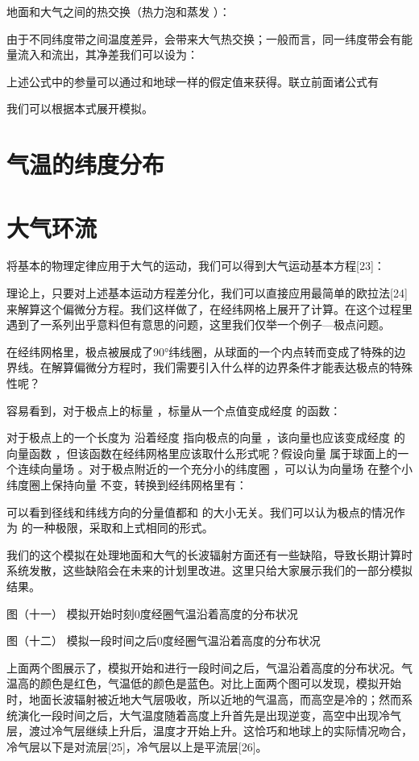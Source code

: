 \documentclass[a4paper,10.5pt]{book}
\begin{document}
地面和大气之间的热交换（热力泡和蒸发 ）：

由于不同纬度带之间温度差异，会带来大气热交换；一般而言，同一纬度带会有能量流入和流出，其净差我们可以设为：

上述公式中的参量可以通过和地球一样的假定值来获得。联立前面诸公式有

我们可以根据本式展开模拟。


\section{气温的纬度分布}

\section{大气环流}

将基本的物理定律应用于大气的运动，我们可以得到大气运动基本方程[23]：



理论上，只要对上述基本运动方程差分化，我们可以直接应用最简单的欧拉法[24]来解算这个偏微分方程。我们这样做了，在经纬网格上展开了计算。在这个过程里遇到了一系列出乎意料但有意思的问题，这里我们仅举一个例子—极点问题。

在经纬网格里，极点被展成了90°纬线圈，从球面的一个内点转而变成了特殊的边界线。在解算偏微分方程时，我们需要引入什么样的边界条件才能表达极点的特殊性呢？

容易看到，对于极点上的标量  ，标量从一个点值变成经度  的函数：



对于极点上的一个长度为  沿着经度  指向极点的向量  ，该向量也应该变成经度  的向量函数  ，但该函数在经纬网格里应该取什么形式呢？假设向量  属于球面上的一个连续向量场  。对于极点附近的一个充分小的纬度圈 ，可以认为向量场  在整个小纬度圈上保持向量  不变，转换到经纬网格里有：



可以看到径线和纬线方向的分量值都和  的大小无关。我们可以认为极点的情况作为  的一种极限，采取和上式相同的形式。

我们的这个模拟在处理地面和大气的长波辐射方面还有一些缺陷，导致长期计算时系统发散，这些缺陷会在未来的计划里改进。这里只给大家展示我们的一部分模拟结果。


图（十一）
模拟开始时刻0度经圈气温沿着高度的分布状况



图（十二）
模拟一段时间之后0度经圈气温沿着高度的分布状况

上面两个图展示了，模拟开始和进行一段时间之后，气温沿着高度的分布状况。气温高的颜色是红色，气温低的颜色是蓝色。对比上面两个图可以发现，模拟开始时，地面长波辐射被近地大气层吸收，所以近地的气温高，而高空是冷的；然而系统演化一段时间之后，大气温度随着高度上升首先是出现逆变，高空中出现冷气层，渡过冷气层继续上升后，温度才开始上升。这恰巧和地球上的实际情况吻合，冷气层以下是对流层[25]，冷气层以上是平流层[26]。
\end{document}
